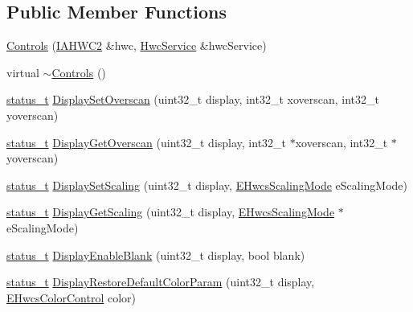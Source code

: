 \subsection*{Public Member Functions}
\begin{DoxyCompactItemize}
\item 
\mbox{\hyperlink{classandroid_1_1HwcService_1_1Controls_aeacac33397b3210a02241d5d477f81e5}{Controls}} (\mbox{\hyperlink{classandroid_1_1IAHWC2}{I\+A\+H\+W\+C2}} \&hwc, \mbox{\hyperlink{classandroid_1_1HwcService}{Hwc\+Service}} \&hwc\+Service)
\item 
virtual \mbox{\hyperlink{classandroid_1_1HwcService_1_1Controls_aa36cd79cbdaae3d5993f5159682cce25}{$\sim$\+Controls}} ()
\item 
\mbox{\hyperlink{hwcserviceapi_8h_a3806fb2027d9a316d8ca8d9b8b8eb96f}{status\+\_\+t}} \mbox{\hyperlink{classandroid_1_1HwcService_1_1Controls_adcf1f387f3090dc329279f9d0c433baf}{Display\+Set\+Overscan}} (uint32\+\_\+t display, int32\+\_\+t xoverscan, int32\+\_\+t yoverscan)
\item 
\mbox{\hyperlink{hwcserviceapi_8h_a3806fb2027d9a316d8ca8d9b8b8eb96f}{status\+\_\+t}} \mbox{\hyperlink{classandroid_1_1HwcService_1_1Controls_ae9070f7ea0cce4a96d95bdcda6447324}{Display\+Get\+Overscan}} (uint32\+\_\+t display, int32\+\_\+t $\ast$xoverscan, int32\+\_\+t $\ast$yoverscan)
\item 
\mbox{\hyperlink{hwcserviceapi_8h_a3806fb2027d9a316d8ca8d9b8b8eb96f}{status\+\_\+t}} \mbox{\hyperlink{classandroid_1_1HwcService_1_1Controls_a5fb40a804ceea847a8ec98de7387d2ec}{Display\+Set\+Scaling}} (uint32\+\_\+t display, \mbox{\hyperlink{hwcserviceapi_8h_acdadfd5e7f15097833789174e442083f}{E\+Hwcs\+Scaling\+Mode}} e\+Scaling\+Mode)
\item 
\mbox{\hyperlink{hwcserviceapi_8h_a3806fb2027d9a316d8ca8d9b8b8eb96f}{status\+\_\+t}} \mbox{\hyperlink{classandroid_1_1HwcService_1_1Controls_a374b5ef0ffbe6cfc6cce6981b0647431}{Display\+Get\+Scaling}} (uint32\+\_\+t display, \mbox{\hyperlink{hwcserviceapi_8h_acdadfd5e7f15097833789174e442083f}{E\+Hwcs\+Scaling\+Mode}} $\ast$e\+Scaling\+Mode)
\item 
\mbox{\hyperlink{hwcserviceapi_8h_a3806fb2027d9a316d8ca8d9b8b8eb96f}{status\+\_\+t}} \mbox{\hyperlink{classandroid_1_1HwcService_1_1Controls_ab38acaba6b6dfa89a91f1fd12bfc1943}{Display\+Enable\+Blank}} (uint32\+\_\+t display, bool blank)
\item 
\mbox{\hyperlink{hwcserviceapi_8h_a3806fb2027d9a316d8ca8d9b8b8eb96f}{status\+\_\+t}} \mbox{\hyperlink{classandroid_1_1HwcService_1_1Controls_abbb4cbd0508e1faf4ee4141a9c64b5b0}{Display\+Restore\+Default\+Color\+Param}} (uint32\+\_\+t display, \mbox{\hyperlink{hwcserviceapi_8h_a1d1cbf448ce748672cf3dd96675d70e4}{E\+Hwcs\+Color\+Control}} color)

\end{DoxyCompactItemize}
